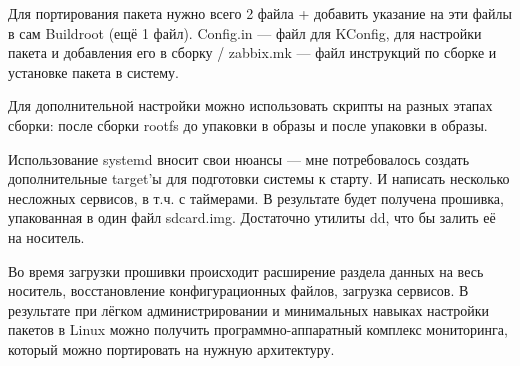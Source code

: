 \documentclass[10pt, a5paper]{article}
\begin{document}
Для портирования пакета нужно всего 2 файла + добавить указание на эти файлы в сам Buildroot (ещё 1 файл). Config.in --- файл для KConfig, для настройки пакета и добавления его в сборку / zabbix.mk --- файл инструкций по сборке и установке пакета в систему.

Для дополнительной настройки можно использовать скрипты на разных этапах сборки: после сборки rootfs до упаковки в образы и после упаковки в образы.

Использование systemd вносит свои нюансы --- мне потребовалось создать дополнительные target’ы для подготовки системы к старту. И написать несколько несложных сервисов, в т.ч. с таймерами.
В результате будет получена прошивка, упакованная в один файл sdcard.img. Достаточно утилиты dd, что бы залить её на носитель.

Во время загрузки прошивки происходит расширение раздела данных на весь носитель,  восстановление конфигурационных файлов, загрузка сервисов. В результате при лёгком администрировании и минимальных навыках настройки пакетов в Linux можно получить программно-аппаратный комплекс мониторинга, который можно портировать на нужную архитектуру.
\end{document}

